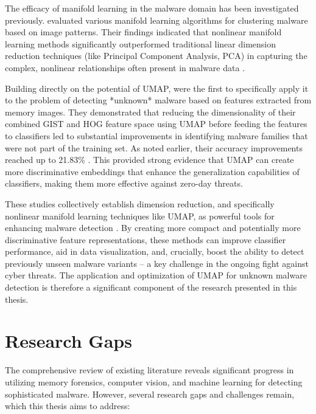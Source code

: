 The efficacy of manifold learning in the malware domain has been investigated previously. \citet{sharma2018efficacy} evaluated various manifold learning algorithms for clustering malware based on image patterns. Their findings indicated that nonlinear manifold learning methods significantly outperformed traditional linear dimension reduction techniques (like Principal Component Analysis, PCA) in capturing the complex, nonlinear relationships often present in malware data \cite{sharma2018efficacy}.

Building directly on the potential of UMAP, \citet{bozkir2021catch} were the first to specifically apply it to the problem of detecting *unknown* malware based on features extracted from memory images. They demonstrated that reducing the dimensionality of their combined GIST and HOG feature space using UMAP before feeding the features to classifiers led to substantial improvements in identifying malware families that were not part of the training set. As noted earlier, their accuracy improvements reached up to 21.83\% \cite{bozkir2021catch}. This provided strong evidence that UMAP can create more discriminative embeddings that enhance the generalization capabilities of classifiers, making them more effective against zero-day threats.

These studies collectively establish dimension reduction, and specifically nonlinear manifold learning techniques like UMAP, as powerful tools for enhancing malware detection \cite{bozkir2021catch}. By creating more compact and potentially more discriminative feature representations, these methods can improve classifier performance, aid in data visualization, and, crucially, boost the ability to detect previously unseen malware variants – a key challenge in the ongoing fight against cyber threats. The application and optimization of UMAP for unknown malware detection is therefore a significant component of the research presented in this thesis.

\section{Research Gaps}
\label{sec:research_gaps}

The comprehensive review of existing literature reveals significant progress in utilizing memory forensics, computer vision, and machine learning for detecting sophisticated malware. However, several research gaps and challenges remain, which this thesis aims to address:

